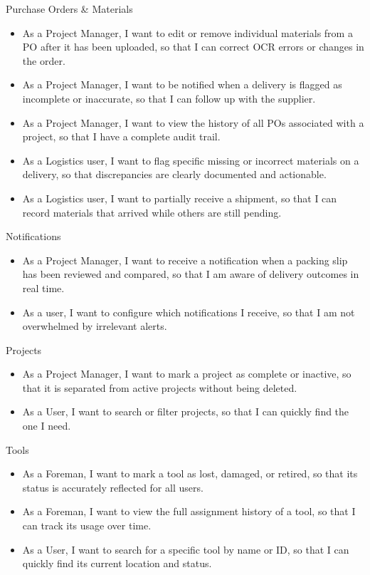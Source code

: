 \documentclass{article}
\begin{document}
Purchase Orders \& Materials
\begin{itemize}
    \item As a Project Manager, I want to edit or remove individual materials from a PO after it has been uploaded, so that I can correct OCR errors or changes in the order.
    \item As a Project Manager, I want to be notified when a delivery is flagged as incomplete or inaccurate, so that I can follow up with the supplier.
    \item As a Project Manager, I want to view the history of all POs associated with a project, so that I have a complete audit trail.
    \item As a Logistics user, I want to flag specific missing or incorrect materials on a delivery, so that discrepancies are clearly documented and actionable.
    \item As a Logistics user, I want to partially receive a shipment, so that I can record materials that arrived while others are still pending.
\end{itemize}

Notifications
\begin{itemize}
    \item As a Project Manager, I want to receive a notification when a packing slip has been reviewed and compared, so that I am aware of delivery outcomes in real time.
    \item As a user, I want to configure which notifications I receive, so that I am not overwhelmed by irrelevant alerts.
\end{itemize}
 
Projects
\begin{itemize}
    \item As a Project Manager, I want to mark a project as complete or inactive, so that it is separated from active projects without being deleted.
    \item As a User, I want to search or filter projects, so that I can quickly find the one I need.
\end{itemize}
 
Tools
\begin{itemize}
    \item As a Foreman, I want to mark a tool as lost, damaged, or retired, so that its status is accurately reflected for all users.
    \item As a Foreman, I want to view the full assignment history of a tool, so that I can track its usage over time.
    \item As a User, I want to search for a specific tool by name or ID, so that I can quickly find its current location and status.
\end{itemize}
 
\end{document}
